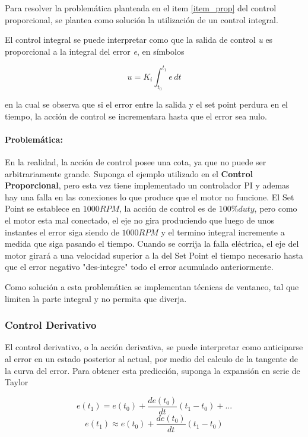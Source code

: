\documentclass[10pt,conference,a4paper,onecolumn]{article}%
\begin{document}
Para resolver la problemática planteada en el item \ref{item_prop} del control proporcional, se plantea como solución la utilización de un control integral. 

El control integral se puede interpretar como que la salida de control \textit{u} es proporcional a la integral del error \textit{e}, en símbolos


\begin{equation}
u=K_i \int_{t_0}^{t_1} e \,dt 
\label{eq:control_integral}
\end{equation}


en la cual se observa que si el error entre la salida y el set point perdura en el tiempo, la acción de control se incrementara hasta que el error sea nulo.

\paragraph{Problemática:} En la realidad, la acción de control posee una cota, ya que no puede ser arbitrariamente grande. 
Suponga el ejemplo utilizado en el \textbf{Control Proporcional}, pero esta vez tiene implementado un controlador PI y ademas hay una falla en las conexiones lo que produce que el motor no funcione. El Set Point se establece en $1000RPM$, la acción de control es de $100\%duty$, pero como el motor esta mal conectado, el eje no gira produciendo que luego de unos instantes el error siga siendo de  $1000RPM$ y el termino integral incremente a medida que siga pasando el tiempo. Cuando se corrija la falla eléctrica, el eje del motor girará a una velocidad superior a la del Set Point el tiempo necesario hasta que el error negativo "des-integre" todo el error acumulado anteriormente.

Como solución a esta problemática se implementan técnicas de ventaneo, tal que limiten la parte integral y no permita que diverja.  



\subsubsection{Control Derivativo}
El control derivativo, o la acción derivativa, se puede interpretar como anticiparse al error en un estado posterior al actual, por medio del calculo de la tangente de la curva del error. Para obtener esta predicción, suponga la expansión en serie de Taylor


\begin{equation*}
e(t_1)=e(t_0)+\frac{de(t_0)}{dt}(t_1-t_0)+... 
\end{equation*}
\begin{equation}
 e(t_1) \approx e(t_0)+\frac{de(t_0)}{dt}(t_1-t_0)
\end{equation}
\end{document}
